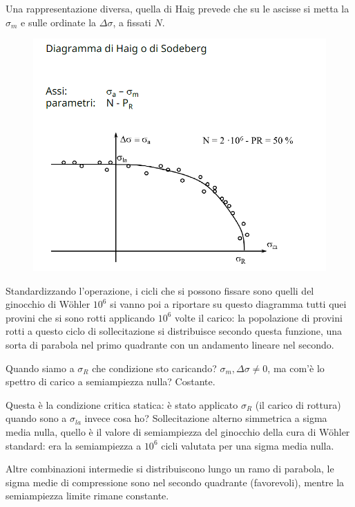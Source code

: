 			Una rappresentazione diversa, quella di Haig prevede che su le ascisse si metta la $\sigma_m$ e sulle ordinate la $\Delta \sigma$, a fissati $N$.
			\begin{figure}[H]
				\centering
				\includegraphics[width=0.5\linewidth]{immagini_11/screenshot003}
				\label{fig:screenshot003}
			\end{figure}			
			Standardizzando l'operazione, i cicli che si possono fissare sono quelli del ginocchio di Wöhler $10^6$ si vanno poi a riportare su questo diagramma tutti quei provini che si sono rotti applicando $10^6$ volte il carico: la popolazione di provini rotti a questo ciclo di sollecitazione si distribuisce secondo questa funzione, una sorta di parabola nel primo quadrante con un andamento lineare nel secondo. \newline
			
			Quando siamo a $\sigma_R$ che condizione sto caricando? $\sigma_m, \Delta\sigma\ne0$, ma com'è lo spettro di carico a semiampiezza nulla? Costante.
			
			Questa è la condizione critica statica: è stato applicato $\sigma_R$ (il carico di rottura) quando sono a $\sigma_{la}$ invece cosa ho? Sollecitazione alterno simmetrica a sigma media nulla, quello è il valore di semiampiezza del ginocchio della cura di Wöhler standard: era la semiampiezza a $10^6$ cicli valutata per una sigma media nulla. 
			
			Altre combinazioni intermedie si distribuiscono lungo un ramo di parabola, le sigma medie di compressione sono nel secondo quadrante (favorevoli), mentre la semiampiezza limite rimane constante. \newline 
			 
